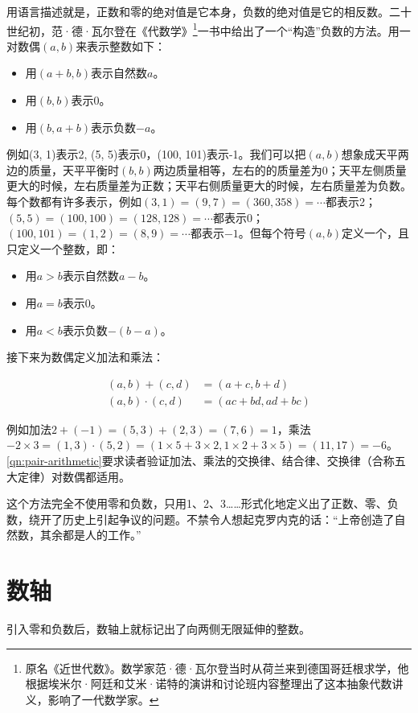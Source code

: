\documentclass[b5paper]{ctexart}
\begin{document}
 
用语言描述就是，正数和零的绝对值是它本身，负数的绝对值是它的相反数。二十世纪初，范·德·瓦尔登在《代数学》\footnote{原名《近世代数》。数学家范·德·瓦尔登当时从荷兰来到德国哥廷根求学，他根据埃米尔·阿廷和艾米·诺特的演讲和讨论班内容整理出了这本抽象代数讲义，影响了一代数学家。}一书中给出了一个“构造”负数的方法。用一对数偶$(a, b)$来表示整数如下：
\begin{itemize}
\item 用$(a + b, b)$表示自然数$a$。
\item 用$(b, b)$表示0。
\item 用$(b, a + b)$表示负数$-a$。
\end{itemize}

例如(3, 1)表示2, (5, 5)表示0，(100, 101)表示-1。我们可以把$(a, b)$想象成天平两边的质量，天平平衡时$(b, b)$两边质量相等，左右的的质量差为0；天平左侧质量更大的时候，左右质量差为正数；天平右侧质量更大的时候，左右质量差为负数。每个数都有许多表示，例如$(3, 1) = (9, 7) = (360, 358) = \cdots$都表示2；$(5, 5) = (100, 100) = (128, 128) = \cdots$都表示0；$(100, 101) = (1, 2) = (8, 9) = \cdots$都表示$-1$。但每个符号$(a, b)$定义一个，且只定义一个整数，即：

\begin{itemize}
\item 用$a > b$表示自然数$a - b$。
\item 用$a = b$表示0。
\item 用$a < b$表示负数$-(b - a)$。
\end{itemize}

接下来为数偶定义加法和乘法：

\begin{align}
(a, b) + (c, d) &= (a + c, b + d) \\
(a, b) \cdot (c, d) &= (ac + bd, ad + bc)
\label{eq:pair-add-mul}
\end{align}

例如加法$2 + (-1) = (5, 3) + (2, 3) = (7, 6) = 1$，乘法$-2 \times 3 = (1, 3) \cdot (5, 2) = (1 \times 5 + 3 \times 2, 1 \times 2 + 3 \times 5) = (11, 17) = -6$。\cref{qn:pair-arithmetic}要求读者验证加法、乘法的交换律、结合律、交换律（合称五大定律）对数偶都适用。

这个方法完全不使用零和负数，只用1、2、3……形式化地定义出了正数、零、负数，绕开了历史上引起争议的问题。不禁令人想起克罗内克的话：“上帝创造了自然数，其余都是人的工作。”

\section{数轴}
引入零和负数后，数轴上就标记出了向两侧无限延伸的整数。
\end{document}
